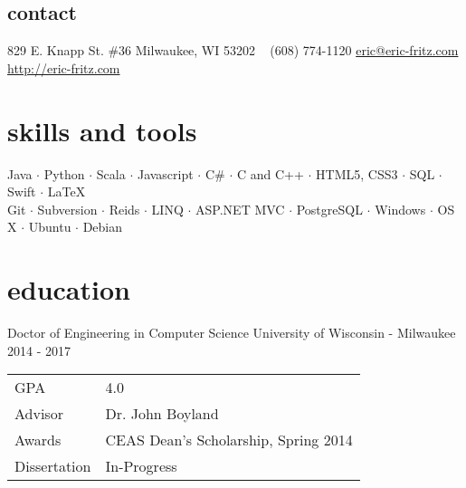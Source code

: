 \documentclass[]{fritz-resume}
\begin{document}


\begin{aside}
  \section{contact}
    829 E. Knapp St. \#36
    Milwaukee, WI 53202
    ~
    (608) 774-1120
    \href{mailto:eric@eric-fritz.com?subject=Resume}{eric@eric-fritz.com}
    \href{http://eric-fritz.com}{http://eric-fritz.com}
\end{aside}


\section{skills and tools}

\begin{centering}
{ \small
  Java $\cdot$
  Python $\cdot$
  Scala $\cdot$
  Javascript $\cdot$
  C\# $\cdot$
  C and C++ $\cdot$
  HTML5, CSS3 $\cdot$
  SQL $\cdot$
  Swift $\cdot$
  \LaTeX{} \\
  Git $\cdot$
  Subversion $\cdot$
  Reids $\cdot$
  LINQ $\cdot$
  ASP.NET MVC $\cdot$
  PostgreSQL $\cdot$
  Windows $\cdot$
  OS X $\cdot$
  Ubuntu $\cdot$
  Debian
}

\end{centering}


\section{education}

\entry
  {Doctor of Engineering in Computer Science}
  {University of Wisconsin - Milwaukee}
  {2014 - 2017}
  {
    \begin{tabular}{>{\raggedleft}p{1.7cm} l}
      GPA          & 4.0 \\
      Advisor      & Dr. John Boyland \\
      Awards       & CEAS Dean's Scholarship, Spring 2014 \\
      Dissertation & In-Progress
    \end{tabular}
  }
\end{document}
